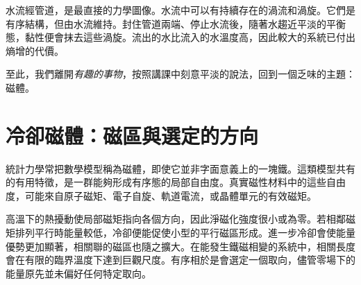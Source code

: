 水流經管道，是最直接的力學圖像。水流中可以有持續存在的渦流和渦旋。它們是有序結構，但由水流維持。封住管道兩端、停止水流後，隨著水趨近平淡的平衡態，黏性便會抹去這些渦旋。流出的水比流入的水溫度高，因此較大的系統已付出熵增的代價。

\begin{classroomqa}
\end{classroomqa}

至此，我們離開\emph{有趣的事物}，按照講課中刻意平淡的說法，回到一個乏味的主題：磁體。

\section{冷卻磁體：磁區與選定的方向}

統計力學常把數學模型稱為磁體，即使它並非字面意義上的一塊鐵。這類模型共有的有用特徵，是一群能夠形成有序態的局部自由度。真實磁性材料中的這些自由度，可能來自原子磁矩、電子自旋、軌道電流，或晶體單元的有效磁矩。

高溫下的熱擾動使局部磁矩指向各個方向，因此淨磁化強度很小或為零。若相鄰磁矩排列平行時能量較低，冷卻便能促使小型的平行磁區形成。進一步冷卻會使能量優勢更加顯著，相關聯的磁區也隨之擴大。在能發生鐵磁相變的系統中，相關長度會在有限的臨界溫度下達到巨觀尺度。有序相於是會選定一個取向，儘管零場下的能量原先並未偏好任何特定取向。

\begin{classroomqa}
\end{classroomqa}

\begin{classroomqa}
\end{classroomqa}

